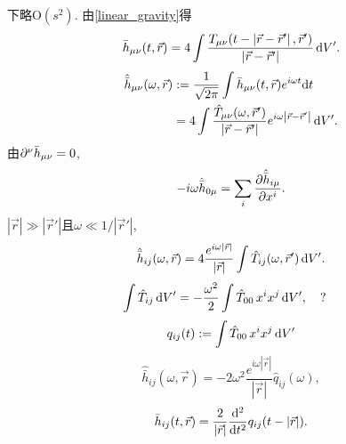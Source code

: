 下略$\text{O}(s^2)$. 由\eqref{linear_gravity}得
\begin{equation}
    \bar{h}_{\mu\nu}(t,\vec{r}) = 4\int 
    \frac{T_{\mu\nu}(t-\left\lvert\vec{r}-\vec{r}'\right\rvert,\vec{r}')}{\left\lvert\vec{r}-\vec{r}'\right\rvert}\,\mathrm{d} V'.
\end{equation}
\begin{align}
    \hat{\bar{h}}_{\mu\nu}(\omega,\vec{r})&:=\frac{1}{\sqrt{2\pi}}
    \int\bar{h}_{\mu\nu}(t,\vec{r})e^{i\omega t}\mathrm{d} t\\
    &=4\int 
    \frac{\hat{T}_{\mu\nu}(\omega,\vec{r}')}{\left\lvert\vec{r}-\vec{r}'\right\rvert}e^{i\omega\left\lvert\vec{r}-\vec{r}'\right\rvert}\,\mathrm{d} V'.
\end{align}
由$\partial^{\nu}\bar{h}_{\mu\nu}=0$,
\begin{equation}
    -i\omega\hat{\bar{h}}_{0\mu}=\sum_{i}\frac{\partial\hat{\bar{h}}_{i\mu}}{\partial x^{i}}.
\end{equation}
$\left\lvert \vec{r}\right\rvert \gg \left\lvert \vec{r}'\right\rvert$且$\omega\ll1/\left\lvert \vec{r}'\right\rvert$,
\begin{equation}
    \hat{\bar{h}}_{ij}(\omega,\vec{r}) = 4
    \frac{e^{i\omega\left\lvert\vec{r}\right\rvert}}{\left\lvert\vec{r}\right\rvert}
    \int \hat{T}_{ij}(\omega,\vec{r}')\,\mathrm{d} V'.
\end{equation}
\begin{align}
    \int \hat{T}_{ij}\,\mathrm{d} V'
    &= -\frac{\omega^2}{2}\int \hat{T}_{00}\,x^ix^j\,\mathrm{d} V',\quad\text{?}
\end{align}
\begin{equation}
    q_{ij}(t):=\int\hat{T}_{00}\,x^ix^j\,\mathrm{d} V'
\end{equation}
\begin{equation}
    \hat{\bar{h}}_{ij}(\omega,\vec{r}) = -2\omega^2\frac{e^{i\omega\left\lvert\vec{r}\right\rvert}}{\left\lvert\vec{r}\right\rvert}\hat{q}_{ij}(\omega),
\end{equation}
\begin{equation}
    {\bar{h}}_{ij}(t,\vec{r}) = \frac{2}{\left\lvert\vec{r}\right\rvert}
    \frac{\mathrm{d}^2}{\mathrm{d} t^2}{q}_{ij}(t-\left\lvert\vec{r}\right\rvert).
\end{equation}
